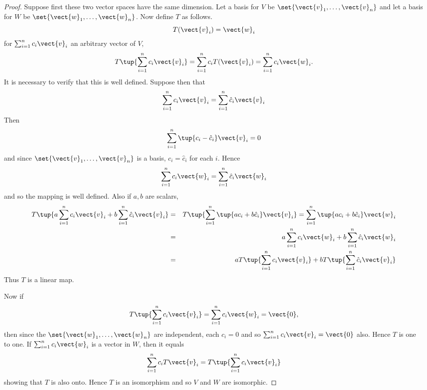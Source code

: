 \begin{proof}Suppose first these two vector spaces have the same
dimension. Let a basis for $V$ be $\set{
\vect{v}_{1},\ldots,\vect{v}_{n}} $ and let a basis for $W$ be $
\set{\vect{w}_{1},\ldots,\vect{w}_{n}}$. Now define $T$ as
follows. 
\begin{equation*}
T(\vect{v}_{i})=\vect{w}_{i}
\end{equation*}
for $\sum_{i=1}^{n}c_{i}\vect{v}_{i}$ an arbitrary vector of $V$,%
\begin{equation*}
T\tup{\sum_{i=1}^{n}c_{i}\vect{v}_{i}} = \sum_{i=1}^{n}c_{i}T
(\vect{v}_{i})=\sum_{i=1}^{n}c_{i}\vect{w}_{i}.
\end{equation*}
It is necessary to verify that this is well defined. Suppose then that 
\begin{equation*}
\sum_{i=1}^{n}c_{i}\vect{v}_{i}=\sum_{i=1}^{n}\hat{c}_{i}\vect{v}_{i}
\end{equation*}
Then 
\begin{equation*}
\sum_{i=1}^{n}\tup{c_{i}-\hat{c}_{i}} \vect{v}_{i}=0
\end{equation*}
and since $\set{\vect{v}_{1},\ldots,\vect{v}_{n}} $ is a basis, $
c_{i}=\hat{c}_{i}$ for each $i$. Hence 
\begin{equation*}
\sum_{i=1}^{n}c_{i}\vect{w}_{i}=\sum_{i=1}^{n}\hat{c}_{i}\vect{w}_{i}
\end{equation*}
and so the mapping is well defined. Also if $a,b$ are scalars, 
\begin{eqnarray*}
T\tup{a\sum_{i=1}^{n}c_{i}\vect{v}_{i}+b\sum_{i=1}^{n}\hat{c}_{i}\vect{v}
_{i}} &=&T\tup{\sum_{i=1}^{n}\tup{ac_{i}+b\hat{c}_{i}} \vect{v
}_{i}} =\sum_{i=1}^{n}\tup{ac_{i}+b\hat{c}_{i}} \vect{w}_{i} \\
&=&a\sum_{i=1}^{n}c_{i}\vect{w}_{i}+b\sum_{i=1}^{n}\hat{c}_{i}\vect{w}_{i} \\
&=&aT\tup{\sum_{i=1}^{n}c_{i}\vect{v}_{i}} +bT\tup{\sum_{i=1}^{n}
\hat{c}_{i}\vect{v}_{i}}
\end{eqnarray*}
Thus $T$ is a linear map.

Now if 
\begin{equation*}
T\tup{\sum_{i=1}^{n}c_{i}\vect{v}_{i}} =\sum_{i=1}^{n}c_{i}\vect{w}
_{i}=\vect{0},
\end{equation*}
then since the $\set{\vect{w}_{1},\ldots,\vect{w}_{n}} $ are
independent, each $c_{i}=0$ and so $\sum_{i=1}^{n}c_{i}\vect{v}_{i}=\vect{0}$
also. Hence $T$ is one to one. If $\sum_{i=1}^{n}c_{i}\vect{w}_{i}$ is a
vector in $W$, then it equals 
\begin{equation*}
\sum_{i=1}^{n}c_{i}T\vect{v}_{i}=T\tup{\sum_{i=1}^{n}c_{i}\vect{v}_{i}}
\end{equation*}
showing that $T$ is also onto. Hence $T$ is an isomorphism and so $V$ and $W$
are isomorphic.


\end{proof}
